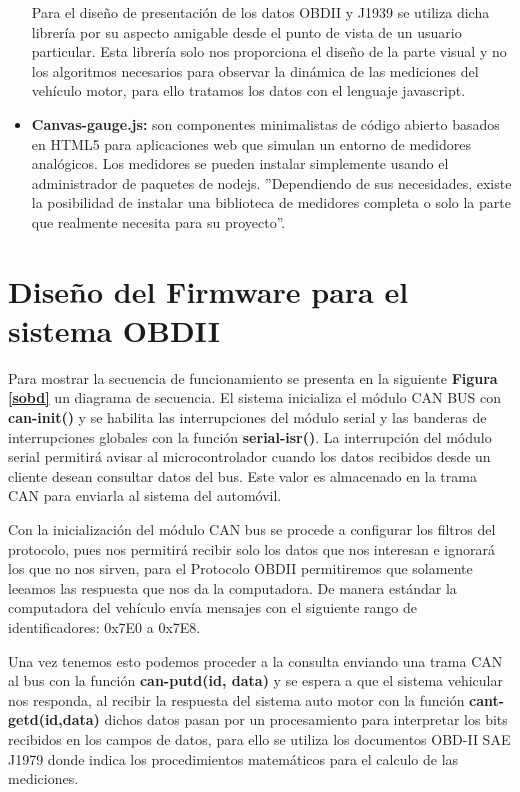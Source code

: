 \begin{itemize}
	Para el diseño de presentación de los datos OBDII y J1939 se utiliza dicha librería por su aspecto amigable desde el punto de vista de un usuario particular. Esta librería solo nos proporciona el diseño de la parte visual y no los algoritmos necesarios para observar la dinámica de las mediciones del vehículo motor, para ello tratamos los datos con el lenguaje javascript. 
	
	\item {\bfseries Canvas-gauge.js: }son componentes minimalistas de código abierto basados en HTML5 para aplicaciones web que simulan un entorno de medidores analógicos. Los medidores  se pueden instalar simplemente usando el administrador de paquetes de nodejs. ''Dependiendo de sus necesidades, existe la posibilidad de instalar una biblioteca de medidores completa o solo la parte que realmente necesita para su proyecto''. %
	
\end{itemize}


\section{Diseño del Firmware para el sistema OBDII}

Para mostrar la secuencia de funcionamiento se presenta en la siguiente  \textbf{Figura \ref{sobd}} un diagrama de secuencia. El sistema inicializa el módulo CAN BUS con {\bfseries can-init()} y se habilita las interrupciones del módulo serial y las banderas de interrupciones globales con la función {\bfseries serial-isr()}. La interrupción del módulo serial permitirá avisar al microcontrolador cuando los datos recibidos desde un cliente desean consultar datos del bus. Este valor es almacenado en la trama CAN para enviarla al sistema del automóvil.

Con la inicialización del módulo CAN bus se procede a configurar los filtros del protocolo, pues nos permitirá recibir solo los datos que nos interesan e ignorará los que no nos sirven, para el Protocolo OBDII permitiremos que solamente leeamos las respuesta que nos da la computadora. De manera estándar la computadora del vehículo envía mensajes con el siguiente rango de identificadores: 0x7E0 a 0x7E8. 

Una vez tenemos esto podemos proceder a la consulta enviando una trama CAN al bus con la función {\bfseries can-putd(id, data)} y se espera a que el sistema vehicular nos responda, al recibir la respuesta del sistema auto motor con la función {\bfseries cant-getd(id,data)} dichos datos pasan por un procesamiento para interpretar los bits recibidos en los campos de datos, para ello se utiliza los documentos OBD-II SAE J1979 donde indica los procedimientos matemáticos para el calculo de las mediciones. 

